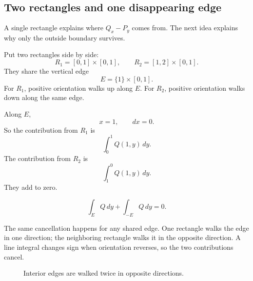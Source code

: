 \subsection{Two rectangles and one disappearing edge}

A single rectangle explains where \(Q_x-P_y\) comes from.  The next idea explains why
only the outside boundary survives.

Put two rectangles side by side:
\[
    R_1=[0,1]\times[0,1],
    \qquad
    R_2=[1,2]\times[0,1].
\]
They share the vertical edge
\[
    E=\{1\}\times[0,1].
\]
For \(R_1\), positive orientation walks up along \(E\).  For \(R_2\), positive orientation
walks down along the same edge.

Along \(E\),
\[
    x=1,
    \qquad
    dx=0.
\]
So the contribution from \(R_1\) is
\[
    \int_0^1 Q(1,y)\,dy.
\]
The contribution from \(R_2\) is
\[
    \int_1^0 Q(1,y)\,dy.
\]
They add to zero.

\[
\boxed{
    \int_E Q\,dy+\int_{-E}Q\,dy=0.
}
\]

The same cancellation happens for any shared edge.  One rectangle walks the edge in
one direction; the neighboring rectangle walks it in the opposite direction.  A line
integral changes sign when orientation reverses, so the two contributions cancel.

\begin{figure}[h]
\centering
{}
\caption{Interior edges are walked twice in opposite directions.}
\end{figure}

